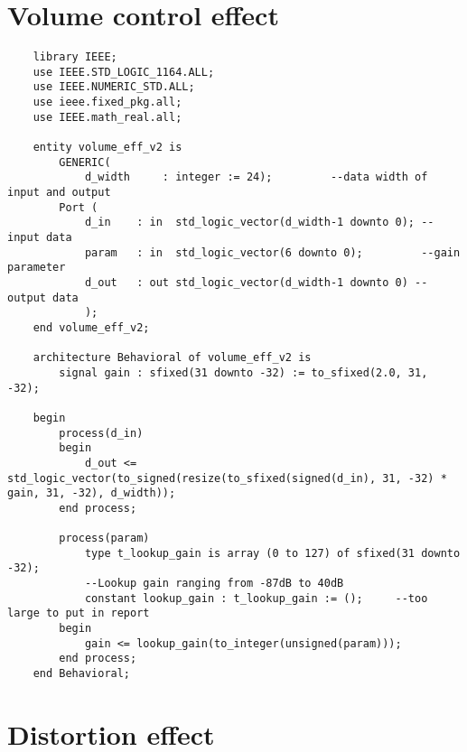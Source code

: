 \section*{Volume control effect}
\begin{lstlisting}
    library IEEE;
    use IEEE.STD_LOGIC_1164.ALL;
    use IEEE.NUMERIC_STD.ALL;
    use ieee.fixed_pkg.all;
    use IEEE.math_real.all;
    
    entity volume_eff_v2 is
        GENERIC(
            d_width     : integer := 24);         --data width of input and output
        Port ( 
            d_in    : in  std_logic_vector(d_width-1 downto 0); --input data
            param   : in  std_logic_vector(6 downto 0);         --gain parameter
            d_out   : out std_logic_vector(d_width-1 downto 0) --output data
            ); 
    end volume_eff_v2;
    
    architecture Behavioral of volume_eff_v2 is
        signal gain : sfixed(31 downto -32) := to_sfixed(2.0, 31, -32);
    
    begin
        process(d_in)
        begin
            d_out <= std_logic_vector(to_signed(resize(to_sfixed(signed(d_in), 31, -32) * gain, 31, -32), d_width));
        end process;
    
        process(param)
            type t_lookup_gain is array (0 to 127) of sfixed(31 downto -32);
            --Lookup gain ranging from -87dB to 40dB
            constant lookup_gain : t_lookup_gain := ();     --too large to put in report
        begin
            gain <= lookup_gain(to_integer(unsigned(param)));
        end process;
    end Behavioral;
\end{lstlisting}

\section*{Distortion effect}

